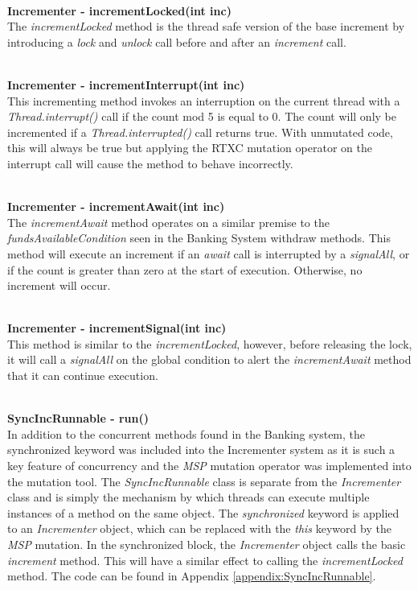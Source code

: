 \documentclass[a4paper,12pt]{article}
\begin{document}
\textbf{\\Incrementer - incrementLocked(int inc)}
\\The \textit{incrementLocked} method is the thread safe version of the base increment by introducing a \textit{lock} and \textit{unlock} call before and after an \textit{increment} call. 

\textbf{\\Incrementer - incrementInterrupt(int inc)}
\\This incrementing method invokes an interruption on the current thread with a \textit{Thread.interrupt()} call if the count mod 5 is equal to 0. The count will only be incremented if a \textit{Thread.interrupted()} call returns true. With unmutated code, this will always be true but applying the RTXC mutation operator on the interrupt call will cause the method to behave incorrectly.   

\textbf{\\Incrementer - incrementAwait(int inc)}
\\The \textit{incrementAwait} method operates on a similar premise to the \textit{fundsAvailableCondition} seen in the Banking System withdraw methods. This method will execute an increment if an \textit{await} call is interrupted by a \textit{signalAll}, or if the count is greater than zero at the start of execution. Otherwise, no increment will occur. 

\textbf{\\Incrementer - incrementSignal(int inc)}
\\ This method is similar to the \textit{incrementLocked}, however, before releasing the lock, it will call a \textit{signalAll} on the global condition to alert the \textit{incrementAwait} method that it can continue execution. 

\textbf{\\SyncIncRunnable - run()}
\\In addition to the concurrent methods found in the Banking system, the synchronized keyword was included into the Incrementer system as it is such a key feature of concurrency and the \textit{MSP} mutation operator was implemented into the mutation tool. The \textit{SyncIncRunnable} class is separate from the \textit{Incrementer} class and is simply the mechanism by which threads can execute multiple instances of a method on the same object. The \textit{synchronized} keyword is applied to an \textit{Incrementer} object, which can be replaced with the \textit{this} keyword by the \textit{MSP} mutation. In the synchronized block, the \textit{Incrementer} object calls the basic \textit{increment} method. This will have a similar effect to calling the \textit{incrementLocked} method. The code can be found in Appendix \ref{appendix:SyncIncRunnable}.  
\end{document}
